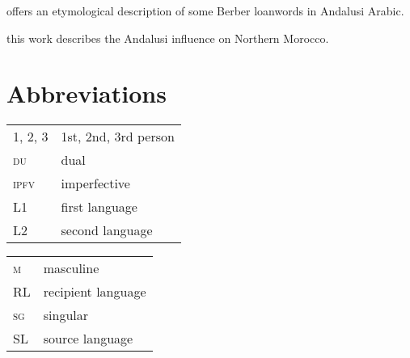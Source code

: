\documentclass[output=paper,modfonts,nonflat]{langsci/langscibook}
\begin{document}
\citep{Ferrando1997} offers an etymological description of some Berber loanwords in Andalusi Arabic. 

\citep{Vicente2010} this work describes the Andalusi influence on Northern Morocco. 

\section*{Abbreviations}

\begin{tabularx}{.45\textwidth}{lQ}
\textsc{1, 2, 3} & 1st, 2nd, 3rd person \\
\textsc{du} & dual \\
\textsc{ipfv} & imperfective \\
L1 & first language \\
L2 & second language \\
\end{tabularx}
\begin{tabularx}{.45\textwidth}{lQ}
\textsc{m} & masculine \\
RL & recipient language \\
\textsc{sg} & singular \\
SL & source language \\
\end{tabularx}
 
\end{document}
